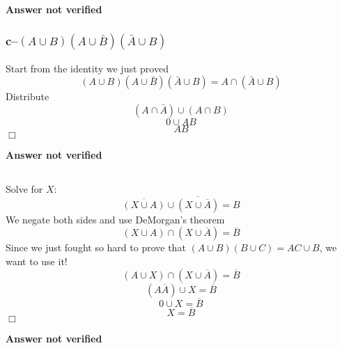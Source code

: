 \textbf{Answer not verified}

\subsubsection{c--$(A \cup B)(A \cup \bar{B})(\bar{A} \cup B)$}
Start from the identity we just proved
\begin{equation}
	(A \cup B)(A \cup \bar{B})(\bar{A} \cup B) = A \cap (\bar{A} \cup B)
\end{equation}
Distribute
\begin{equation}
	(A \cap \bar{A}) \cup (A \cap B)
\end{equation}
\begin{equation}
	0 \cup AB
\end{equation}
\begin{equation}
	AB
\end{equation}
$\Box$

\textbf{Answer not verified} 

\subsection{}
Solve for $X$:
\begin{equation}
	\overline{(X \cup A)} \cup \overline{(X \cup \overline{A})} = B
\end{equation}
We negate both sides and use DeMorgan's theorem
\begin{equation}
	(X \cup A) \cap (X \cup \overline{A}) = \overline{B}
\end{equation}
Since we just fought so hard to prove that $(A \cup B)(B \cup C) = AC \cup B$, we want to use it!
\begin{equation}
	(A \cup X) \cap (X \cup \overline{A}) = \overline{B}
\end{equation}
\begin{equation}
	(A \overline{A}) \cup X = \overline{B}
\end{equation}
\begin{equation}
	0 \cup X = \overline{B}
\end{equation}
\begin{equation}
	X = \overline{B}
\end{equation}
$\Box$

\textbf{Answer not verified}


\subsection{}

